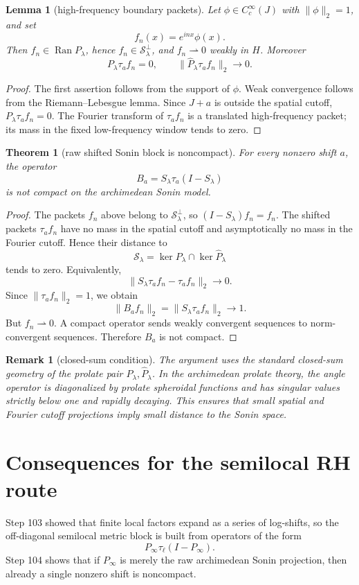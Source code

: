 \documentclass[11pt]{article}
\newtheorem{theorem}{Theorem}
\newtheorem{lemma}{Lemma}
\newtheorem{remark}{Remark}
\begin{document}
\begin{lemma}[high-frequency boundary packets]
Let $\phi\in C_c^\infty(J)$ with $\|\phi\|_2=1$, and set
\[
f_n(x)=e^{inx}\phi(x).
\]
Then $f_n\in\operatorname{Ran}P_\lambda$, hence $f_n\in\mathcal S_\lambda^\perp$, and $f_n\rightharpoonup0$ weakly in $H$.
Moreover
\[
P_\lambda\tau_a f_n=0,
\qquad
\|\widehat P_\lambda\tau_a f_n\|_2\to0.
\]
\end{lemma}
\begin{proof}
The first assertion follows from the support of $\phi$. Weak convergence follows from the Riemann--Lebesgue lemma. Since $J+a$ is outside the spatial cutoff, $P_\lambda\tau_a f_n=0$. The Fourier transform of $\tau_a f_n$ is a translated high-frequency packet; its mass in the fixed low-frequency window tends to zero.
\end{proof}

\begin{theorem}[raw shifted Sonin block is noncompact]
For every nonzero shift $a$, the operator
\[
B_a=S_\lambda\tau_a(I-S_\lambda)
\]
is not compact on the archimedean Sonin model.
\end{theorem}
\begin{proof}
The packets $f_n$ above belong to $\mathcal S_\lambda^\perp$, so $(I-S_\lambda)f_n=f_n$. The shifted packets $\tau_a f_n$ have no mass in the spatial cutoff and asymptotically no mass in the Fourier cutoff. Hence their distance to
\[
\mathcal S_\lambda=\ker P_\lambda\cap\ker\widehat P_\lambda
\]
tends to zero. Equivalently,
\[
\|S_\lambda\tau_a f_n-\tau_a f_n\|_2\to0.
\]
Since $\|\tau_a f_n\|_2=1$, we obtain
\[
\|B_a f_n\|_2=\|S_\lambda\tau_a f_n\|_2\to1.
\]
But $f_n\rightharpoonup0$. A compact operator sends weakly convergent sequences to norm-convergent sequences. Therefore $B_a$ is not compact.
\end{proof}

\begin{remark}[closed-sum condition]
The argument uses the standard closed-sum geometry of the prolate pair $P_\lambda,\widehat P_\lambda$. In the archimedean prolate theory, the angle operator is diagonalized by prolate spheroidal functions and has singular values strictly below one and rapidly decaying. This ensures that small spatial and Fourier cutoff projections imply small distance to the Sonin space.
\end{remark}

\section{Consequences for the semilocal RH route}
Step 103 showed that finite local factors expand as a series of log-shifts, so the off-diagonal semilocal metric block is built from operators of the form
\[
P_\infty\tau_{\ell}(I-P_\infty).
\]
Step 104 shows that if $P_\infty$ is merely the raw archimedean Sonin projection, then already a single nonzero shift is noncompact.
\end{document}
